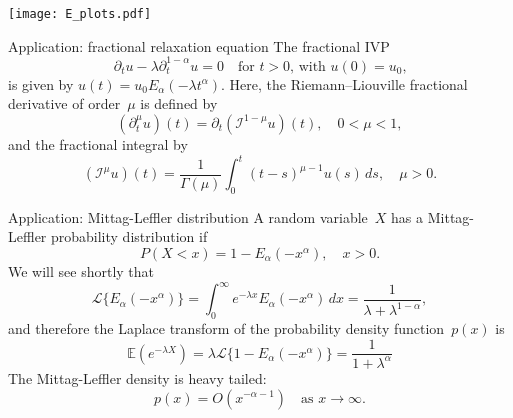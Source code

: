 \documentclass{beamer}
\begin{document}
\begin{frame}
\begin{center}
\texttt{[image: E\_plots.pdf]}
\end{center}
\end{frame}
\begin{frame}{Application: fractional relaxation equation}
The fractional IVP
\[
\partial_t u-\lambda\partial_t^{1-\alpha}u=0
    \quad\text{for $t>0$, with $u(0)=u_0$,}
\]
is given by $u(t)=u_0 E_\alpha(-\lambda t^\alpha)$.
\vfill
Here, the Riemann--Liouville fractional derivative of order~$\mu$ is defined 
by
\[
(\partial_t^\mu u)(t)=\partial_t(\mathcal{I}^{1-\mu}u)(t),\quad0<\mu<1,
\]
and the fractional integral by
\[
(\mathcal{I}^\mu u)(t)=\frac{1}{\Gamma(\mu)}\int_0^t(t-s)^{\mu-1}u(s)\,ds,
\quad\mu>0.
\]
\end{frame}

\begin{frame}{Application: Mittag-Leffler distribution}
A random variable~$X$ has a Mittag-Leffler probability distribution if
\[
P(X<x)=1-E_\alpha(-x^\alpha),\quad x>0.
\]
We will see shortly that 
\[
\mathcal{L}\{E_\alpha(-x^\alpha)\}=\int_0^\infty 
    e^{-\lambda x}E_\alpha(-x^\alpha)\,dx=\frac{1}{\lambda+\lambda^{1-\alpha}},
\]
and therefore the Laplace transform of the probability density function~$p(x)$ 
is
\[
\mathbb{E}(e^{-\lambda X})=\lambda\mathcal{L}\{1-E_\alpha(-x^\alpha)\}
    =\frac{1}{1+\lambda^\alpha}
\]
The Mittag-Leffler density is heavy tailed:
\[
p(x)=O(x^{-\alpha-1})\quad\text{as $x\to\infty$.}
\]
\end{frame}
\end{document}
